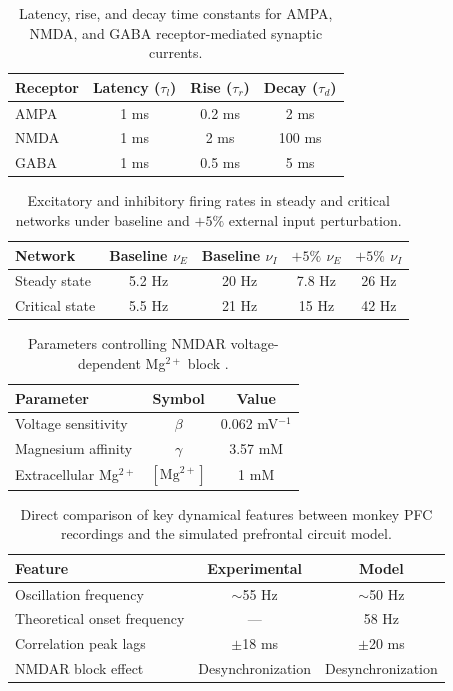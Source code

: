 \documentclass[10pt]{article}
\begin{document}
\begin{table}[htbp]
\centering
\caption{Latency, rise, and decay time constants for AMPA, NMDA, and GABA receptor-mediated synaptic currents.}
\label{tab:synaptic}
\begin{tabular}{lccc}
\toprule
Receptor & Latency ($\tau_l$) & Rise ($\tau_r$) & Decay ($\tau_d$) \\
\midrule
AMPA & 1 ms & 0.2 ms & 2 ms \\
NMDA & 1 ms & 2 ms & 100 ms \\
GABA & 1 ms & 0.5 ms & 5 ms \\
\bottomrule
\end{tabular}
\end{table}

\begin{table}[htbp]
\centering
\caption{Excitatory and inhibitory firing rates in steady and critical networks under baseline and $+5\%$ external input perturbation.}
\label{tab:firing_rates}
\begin{tabular}{lcccc}
\toprule
Network & Baseline $\nu_E$ & Baseline $\nu_I$ & $+5\%$ $\nu_E$ & $+5\%$ $\nu_I$ \\
\midrule
Steady state & 5.2 Hz & 20 Hz & 7.8 Hz & 26 Hz \\
Critical state & 5.5 Hz & 21 Hz & 15 Hz & 42 Hz \\
\bottomrule
\end{tabular}
\end{table}

\begin{table}[htbp]
\centering
\caption{Parameters controlling NMDAR voltage-dependent Mg$^{2+}$ block \citep{jahr1990voltage}.}
\label{tab:nmdar}
\begin{tabular}{lcc}
\toprule
Parameter & Symbol & Value \\
\midrule
Voltage sensitivity & $\beta$ & 0.062 mV$^{-1}$ \\
Magnesium affinity & $\gamma$ & 3.57 mM \\
Extracellular Mg$^{2+}$ & $[\mathrm{Mg}^{2+}]$ & 1 mM \\
\bottomrule
\end{tabular}
\end{table}

\begin{table}[htbp]
\centering
\caption{Direct comparison of key dynamical features between monkey PFC recordings \citep{zick2018blocking} and the simulated prefrontal circuit model.}
\label{tab:model_vs_exp}
\begin{tabular}{lcc}
\toprule
Feature & Experimental & Model \\
\midrule
Oscillation frequency & $\sim$55 Hz & $\sim$50 Hz \\
Theoretical onset frequency & --- & 58 Hz \\
Correlation peak lags & $\pm$18 ms & $\pm$20 ms \\
NMDAR block effect & Desynchronization & Desynchronization \\
\bottomrule
\end{tabular}
\end{table}
\end{document}
